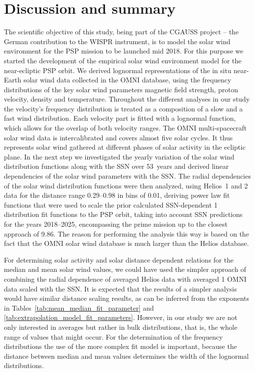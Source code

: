 \section{Discussion and summary}
\label{sec:discussion_and_summary}
The scientific objective of this study, being part of the CGAUSS project -- the German contribution to the WISPR instrument, is to model the solar wind environment for the PSP mission to be launched mid 2018. For this purpose we started the development of the empirical solar wind environment model for the near-ecliptic PSP orbit. We derived lognormal representations of the in situ near-Earth solar wind data collected in the OMNI database, using the frequency distributions of the key solar wind parameters magnetic field strength, proton velocity, density and temperature. Throughout the different analyses in our study the velocity's frequency distribution is treated as a composition of a slow and a fast wind distribution. Each velocity part is fitted with a lognormal function, which allows for the overlap of both velocity ranges. The OMNI multi-spacecraft solar wind data is intercalibrated and covers almost five solar cycles. It thus represents solar wind gathered at different phases of solar activity in the ecliptic plane. In the next step we investigated the yearly variation of the solar wind distribution functions along with the SSN over 53~years and derived linear dependencies of the solar wind parameters with the SSN. The radial dependencies of the solar wind distribution functions were then analyzed, using Helios~1 and 2 data for the distance range \SIrange{0.29}{0.98}{\au} in bins of \SI{0.01}{\au}, deriving power law fit functions that were used to scale the prior calculated SSN-dependent \SI{1}{\au} distribution fit functions to the PSP orbit, taking into account SSN predictions for the years 2018--2025, encompassing the prime mission up to the closest approach of \SI{9.86}{\Rs}. The reason for performing the analysis this way is based on the fact that the OMNI solar wind database is much larger than the Helios database.

For determining solar activity and solar distance dependent relations for the median and mean solar wind values, we could have used the simpler approach of combining the radial dependence of averaged Helios data with averaged \SI{1}{\au} OMNI data scaled with the SSN. It is expected that the results of a simpler analysis would have similar distance scaling results, as can be inferred from the exponents in Tables~\ref{tab:mean_median_fit_parameter} and \ref{tab:extrapolation_model_fit_parameters}. However, in our study we are not only interested in averages but rather in bulk distributions, that is, the whole range of values that might occur. For the determination of the frequency distributions the use of the more complex fit model is important, because the distance between median and mean values determines the width of the lognormal distributions.

